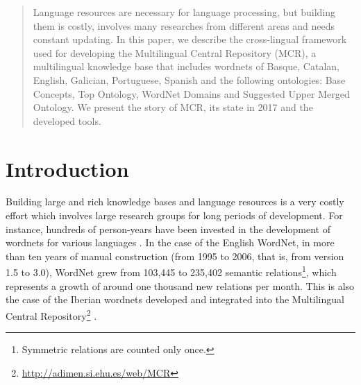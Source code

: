 \documentclass[runningheads]{llncs}
\begin{document}
%
\maketitle              %
%
\begin{abstract}
Language resources are necessary for language processing, but building them is costly, involves many researches from different areas and needs constant updating. In this paper, we describe  the cross-lingual framework used for developing the Multilingual Central Repository (MCR), a multilingual knowledge base that includes wordnets of Basque, Catalan, English, Galician, Portuguese, Spanish and the following ontologies: Base Concepts,  Top Ontology, WordNet Domains and Suggested Upper Merged Ontology. We present the story of MCR, its state in 2017 and the developed tools. 

\end{abstract}
%
%
\section{Introduction} %

Building large and rich knowledge bases  and language resources is a very costly effort which involves large research groups for long periods of development. For instance, hundreds of person-years have been invested in the development of wordnets for various languages \cite{fellbaum98,Vossen:1998,Tufics04,Robkop10}. In the case of the English WordNet, in more than ten years of manual construction (from 1995 to 2006, that is, from version 1.5 to 3.0), WordNet grew from 103,445 to 235,402 semantic relations\footnote{Symmetric relations are counted only once.}, which represents a growth of around one thousand new relations per month. This is also the case of the Iberian wordnets developed and integrated into the Multilingual Central Repository\footnote{\url{http://adimen.si.ehu.es/web/MCR}} \cite{gonzalez2012multilingual}. 
\end{document}
